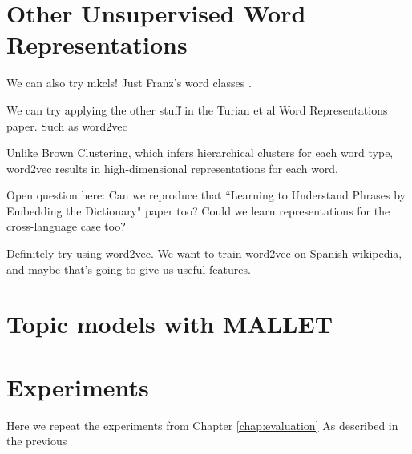 \section{Other Unsupervised Word Representations}
We can also try mkcls! Just Franz's word classes \cite{och1999efficient}.


We can try applying the other stuff in the Turian et al Word Representations
paper. Such as word2vec \cite{mikolovword2vec}

Unlike Brown Clustering, which infers hierarchical clusters for each word type,
word2vec results in high-dimensional representations for each word.

Open question here:
Can we reproduce that ``Learning to Understand Phrases by Embedding the
Dictionary" paper too? Could we learn representations for the cross-language
case too?

Definitely try using word2vec. We want to train word2vec on Spanish wikipedia,
and maybe that's going to give us useful features.

\section{Topic models with MALLET}

\section{Experiments}
Here we repeat the experiments from Chapter \ref{chap:evaluation}
As described in the previous
